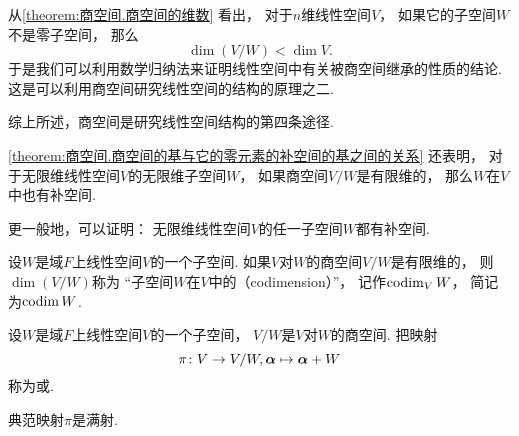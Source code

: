 从\cref{theorem:商空间.商空间的维数} 看出，
对于\(n\)维线性空间\(V\)，
如果它的子空间\(W\)不是零子空间，
那么\[
	\dim(V/W) < \dim V.
\]
于是我们可以利用数学归纳法来证明线性空间中有关被商空间继承的性质的结论.
这是可以利用商空间研究线性空间的结构的原理之二.

综上所述，商空间是研究线性空间结构的第四条途径.

\cref{theorem:商空间.商空间的基与它的零元素的补空间的基之间的关系} 还表明，
对于无限维线性空间\(V\)的无限维子空间\(W\)，
如果商空间\(V/W\)是有限维的，
那么\(W\)在\(V\)中也有补空间.

更一般地，可以证明：
无限维线性空间\(V\)的任一子空间\(W\)都有补空间.

\begin{definition}
设\(W\)是域\(F\)上线性空间\(V\)的一个子空间.
如果\(V\)对\(W\)的商空间\(V/W\)是有限维的，
则\(\dim(V/W)\)称为
“子空间\(W\)在\(V\)中的（codimension）”，
记作\(\operatorname{codim}_V W\)，
简记为\(\operatorname{codim} W\).
\end{definition}

\begin{definition}
设\(W\)是域\(F\)上线性空间\(V\)的一个子空间，
\(V/W\)是\(V\)对\(W\)的商空间.
把映射\[
	\pi\colon V \to V/W,
	\boldsymbol\alpha \mapsto \boldsymbol\alpha+W
\]称为或.
\end{definition}
\begin{remark}
典范映射\(\pi\)是满射.
\end{remark}
